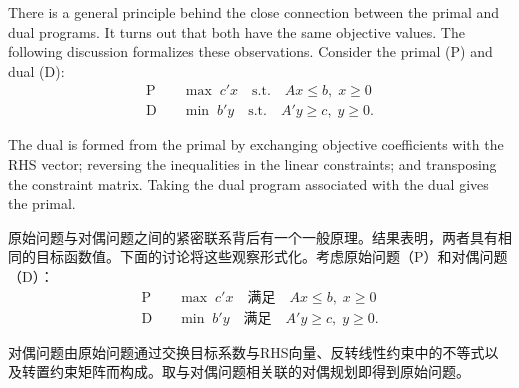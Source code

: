\begin{original}
There is a general principle behind the close connection between the primal and dual programs. It turns out that both have the same objective values. The following discussion formalizes these observations. Consider the primal (P) and dual (D):
\[
\begin{aligned}
\text{P} \quad & \max \; c'x \quad \text{s.t.} \quad Ax \le b,\; x \ge 0 \\
\text{D} \quad & \min \; b'y \quad \text{s.t.} \quad A'y \ge c,\; y \ge 0.
\end{aligned}
\]

The dual is formed from the primal by exchanging objective coefficients with the RHS vector; reversing the inequalities in the linear constraints; and transposing the constraint matrix. Taking the dual program associated with the dual gives the primal.
\end{original}
\begin{translation}
原始问题与对偶问题之间的紧密联系背后有一个一般原理。结果表明，两者具有相同的目标函数值。下面的讨论将这些观察形式化。考虑原始问题（P）和对偶问题（D）：
\[
\begin{aligned}
\text{P} \quad & \max \; c'x \quad \text{满足} \quad Ax \le b,\; x \ge 0 \\
\text{D} \quad & \min \; b'y \quad \text{满足} \quad A'y \ge c,\; y \ge 0.
\end{aligned}
\]

对偶问题由原始问题通过交换目标系数与RHS向量、反转线性约束中的不等式以及转置约束矩阵而构成。取与对偶问题相关联的对偶规划即得到原始问题。
\end{translation}

